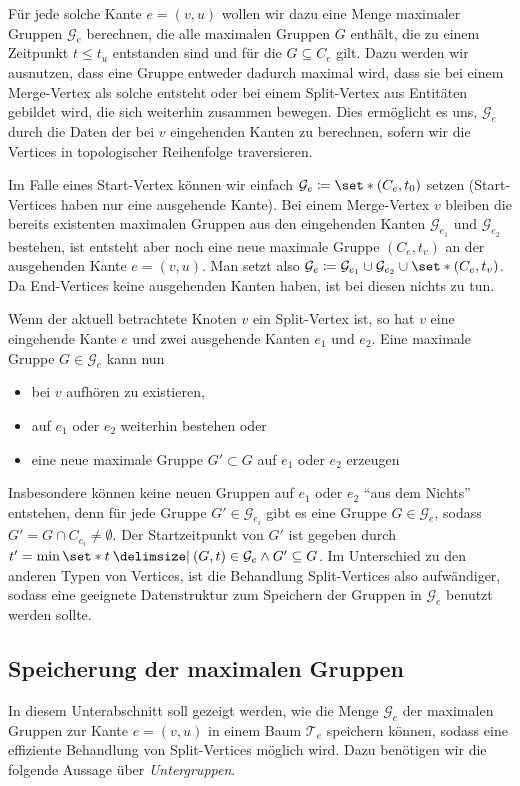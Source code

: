 Für jede solche Kante $e=(v,u)$ wollen wir dazu eine Menge maximaler Gruppen $\mathcal{G}_e$ berechnen, die alle maximalen Gruppen $G$ enthält, die zu einem Zeitpunkt $t \le t_u$ entstanden sind und für die $G \subseteq C_e$ gilt.
Dazu werden wir ausnutzen, dass eine Gruppe entweder dadurch maximal wird, dass sie bei einem Merge-Vertex als solche entsteht oder bei einem Split-Vertex aus Entitäten gebildet wird, die sich weiterhin zusammen bewegen.
Dies ermöglicht es uns, $\mathcal{G}_e$ durch die Daten der bei $v$ eingehenden Kanten zu berechnen, sofern wir die Vertices in topologischer Reihenfolge traversieren.

Im Falle eines Start-Vertex können wir einfach $\mathcal{G}_e \coloneqq \set*{(C_e,t_0)}$ setzen (Start-Vertices haben nur eine ausgehende Kante).
Bei einem Merge-Vertex $v$ bleiben die bereits existenten maximalen Gruppen aus den eingehenden Kanten $\mathcal{G}_{e_1}$ und $\mathcal{G}_{e_2}$ bestehen, ist entsteht aber noch eine neue maximale Gruppe $(C_e,t_v)$ an der ausgehenden Kante $e=(v,u)$.
Man setzt also $\mathcal{G}_e \coloneqq \mathcal{G}_{e_1} \cup \mathcal{G}_{e_2} \cup \set*{(C_e,t_v)}$.
Da End-Vertices keine ausgehenden Kanten haben, ist bei diesen nichts zu tun.

Wenn der aktuell betrachtete Knoten $v$ ein Split-Vertex ist, so hat $v$ eine eingehende Kante $e$ und zwei ausgehende Kanten $e_1$ und $e_2$.
Eine maximale Gruppe $G \in \mathcal{G}_e$ kann nun
\begin{itemize}
	\item bei $v$ aufhören zu existieren,
	\item auf $e_1$ oder $e_2$ weiterhin bestehen oder
	\item eine neue maximale Gruppe $G' \subset G$ auf $e_1$ oder $e_2$ erzeugen
\end{itemize}
Insbesondere können keine neuen Gruppen auf $e_1$ oder $e_2$ \enquote{aus dem Nichts} entstehen, denn für jede Gruppe $G' \in \mathcal{G}_{e_i}$ gibt es eine Gruppe $G \in \mathcal{G}_e$, sodass $G' = G \cap C_{e_i} \neq \emptyset$.
Der Startzeitpunkt von $G'$ ist gegeben durch $t' = \min \set*{t \given (G,t) \in \mathcal{G}_e \wedge G' \subseteq G}$.
Im Unterschied zu den anderen Typen von Vertices, ist die Behandlung Split-Vertices also aufwändiger, sodass eine geeignete Datenstruktur zum Speichern der Gruppen in $\mathcal{G}_e$ benutzt werden sollte.

\subsection{Speicherung der maximalen Gruppen} %
\label{sub:speicherung_der_maximalen_gruppen}
In diesem Unterabschnitt soll gezeigt werden, wie die Menge $\mathcal{G}_e$ der maximalen Gruppen zur Kante $e=(v,u)$ in einem Baum $\mathcal{T}_e$ speichern können, sodass eine effiziente Behandlung von Split-Vertices möglich wird.
Dazu benötigen wir die folgende Aussage über \emph{Untergruppen}.

